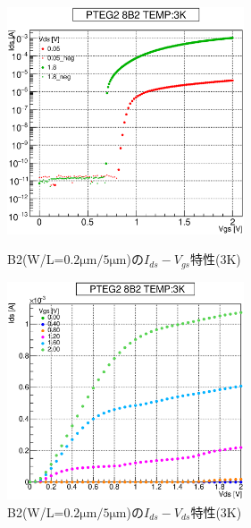 				\begin{figure}[htbp]
					\begin{minipage}{0.5\hsize}
						\begin{center}
							\includegraphics[width=70mm]{./Chapter/Appendix/Picture/NBT/B2/PTEG2_8_B2_IdVg_3K.eps}
						\end{center}
						\caption{B2(W/L=$0.2\mathrm{\mu m}/5\mathrm{\mu m}$)の$I_{ds}-V_{gs}$特性(3K)}
						\label{fig:B2_IdVg_3K}
					\end{minipage}
					\begin{minipage}{0.5\hsize}
						\begin{center}
							\includegraphics[width=70mm]{./Chapter/Appendix/Picture/NBT/B2/PTEG2_8_B2_IdVd_3K.eps}
						\end{center}
						\caption{B2(W/L=$0.2\mathrm{\mu m}/5\mathrm{\mu m}$)の$I_{ds}-V_{ds}$特性(3K)}
						\label{fig:B2_IdVd_3K}
					\end{minipage}
				\end{figure}
